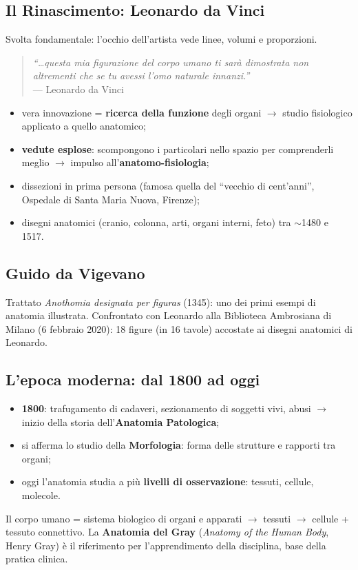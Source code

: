 \subsection{Il Rinascimento: Leonardo da Vinci}
Svolta fondamentale: l'occhio dell'artista vede linee, volumi e proporzioni.
\begin{quote}
\textit{``\ldots questa mia figurazione del corpo umano ti sarà dimostrata non altrementi che se
tu avessi l'omo naturale innanzi.''}\\
\hfill --- Leonardo da Vinci
\end{quote}
\begin{itemize}
  \item vera innovazione = \textbf{ricerca della funzione} degli organi $\rightarrow$ studio
    fisiologico applicato a quello anatomico;
  \item \textbf{vedute esplose}: scompongono i particolari nello spazio per comprenderli meglio
    $\rightarrow$ impulso all'\textbf{anatomo-fisiologia};
  \item dissezioni in prima persona (famosa quella del ``vecchio di cent'anni'', Ospedale di
    Santa Maria Nuova, Firenze);
  \item disegni anatomici (cranio, colonna, arti, organi interni, feto) tra $\sim$1480 e 1517.
\end{itemize}

\subsection{Guido da Vigevano}
Trattato \textit{Anothomia designata per figuras} (1345): uno dei primi esempi di anatomia
illustrata. Confrontato con Leonardo alla Biblioteca Ambrosiana di Milano (6 febbraio 2020): 18
figure (in 16 tavole) accostate ai disegni anatomici di Leonardo.

\subsection{L'epoca moderna: dal 1800 ad oggi}
\begin{itemize}
  \item \textbf{1800}: trafugamento di cadaveri, sezionamento di soggetti vivi, abusi $\rightarrow$
    inizio della storia dell'\textbf{Anatomia Patologica};
  \item si afferma lo studio della \textbf{Morfologia}: forma delle strutture e rapporti tra organi;
  \item oggi l'anatomia studia a più \textbf{livelli di osservazione}: tessuti, cellule, molecole.
\end{itemize}
Il corpo umano = sistema biologico di organi e apparati $\rightarrow$ tessuti $\rightarrow$ cellule
+ tessuto connettivo. La \textbf{Anatomia del Gray} (\textit{Anatomy of the Human Body}, Henry
Gray) è il riferimento per l'apprendimento della disciplina, base della pratica clinica.

